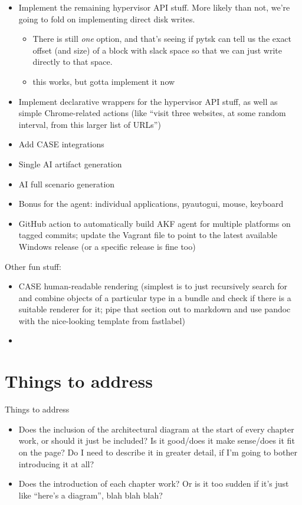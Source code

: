 \begin{itemize}
\tightlist
\item
  Implement the remaining hypervisor API stuff. More likely than not,
  we're going to fold on implementing direct disk writes.

  \begin{itemize}
  \tightlist
  \item
    There is still \emph{one} option, and that's seeing if pytsk can
    tell us the exact offset (and size) of a block with slack space so
    that we can just write directly to that space.
  \item
    this works, but gotta implement it now
  \end{itemize}
\item
  Implement declarative wrappers for the hypervisor API stuff, as well
  as simple Chrome-related actions (like ``visit three websites, at some
  random interval, from this larger list of URLs'')
\item
  Add CASE integrations
\item
  Single AI artifact generation
\item
  AI full scenario generation
\item
  Bonus for the agent: individual applications, pyautogui, mouse,
  keyboard
\item
  GitHub action to automatically build AKF agent for multiple platforms
  on tagged commits; update the Vagrant file to point to the latest
  available Windows release (or a specific release is fine too)
\end{itemize}

Other fun stuff:

\begin{itemize}
\tightlist
\item
  CASE human-readable rendering (simplest is to just recursively search
  for and combine objects of a particular type in a bundle and check if
  there is a suitable renderer for it; pipe that section out to markdown
  and use pandoc with the nice-looking template from fastlabel)
\item
\end{itemize}

\section{Things to address}\label{things-to-address}

Things to address

\begin{itemize}
\tightlist
\item
  Does the inclusion of the architectural diagram at the start of every
  chapter work, or should it just be included? Is it good/does it make
  sense/does it fit on the page? Do I need to describe it in greater
  detail, if I'm going to bother introducing it at all?
\item
  Does the introduction of each chapter work? Or is it too sudden if
  it's just like ``here's a diagram'', blah blah blah?
\end{itemize}

